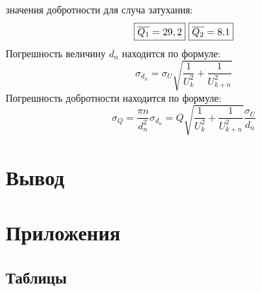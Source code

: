 \documentclass[15pt,a5paper,reqno]{article}
\begin{document}
         значения добротности для случа затухания:
        \[\boxed{\overline{Q_1} = 29,2}\\\ \boxed{\overline{Q_2} = 8.1}\]
        Погрешность величину $d_n$ находится по формуле:
        \[\sigma_{d_n} = \sigma_U\sqrt{\frac{1}{U_k^2} + \frac{1}{U_{k+n}^2}}\]
        Погрешность добротности находится по формуле:
        \[\sigma_Q = \frac{\pi n}{d_n^2}\sigma_{d_n} = Q\sqrt{\frac{1}{U_k^2} + \frac{1}{U_{k+n}^2}}\frac{\sigma_U}{d_n}\]
    
\section{Вывод}

        
    
\newpage
\section{Приложения}

    \subsection{Таблицы}
\end{document}
